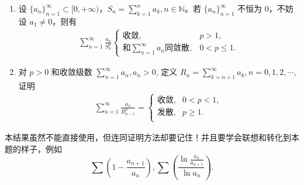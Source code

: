 \documentclass[../../main.tex]{subfiles}%
\begin{document}
\begin{proposition}\label{proposition:部分和相关级数重要性质}
\begin{enumerate}[(1)]
\item 设 \( \{a_n\}_{n = 1}^{\infty} \subset [0, +\infty) \)，\( S_n = \sum_{k = 1}^{n} a_k, n \in \mathbb{N} \)。若 \( \{a_n\}_{n = 1}^{\infty} \) 不恒为 0，不妨设 \( a_1 \neq 0 \)，则有
\begin{align*}
\sum_{n = 1}^{\infty} \frac{a_n}{S_n^p}
\begin{cases} 
\text{收敛}, & p > 1, \\
\text{和} \sum_{n = 1}^{\infty} a_n \text{同敛散}, & 0 < p \leqslant 1 .
\end{cases}
\end{align*}

\item 对 \( p > 0 \) 和收敛级数 \( \sum_{n=1}^{\infty} a_n, a_n > 0 \), 定义 \( R_n = \sum_{k=n+1}^{\infty} a_k, n = 0,1,2,\cdots \),证明
\begin{align*}
\sum_{n=1}^{\infty}{\frac{a_n}{R_{n-1}^{p}}}=\begin{cases}
\text{收敛},&0<p<1,\\
\text{发散},&p\geqslant 1.\\
\end{cases}
\end{align*}
\end{enumerate}
\end{proposition}
\begin{remark}
本结果虽然不能直接使用，但连同证明方法却要记住！并且要学会联想和转化到本题的样子，例如
\[
\sum \left( 1 - \frac{a_{n + 1}}{a_n} \right), \sum \left( \frac{\ln \frac{a_n}{a_{n + 1}}}{\ln a_n} \right).
\]
\end{remark}
\end{document}
